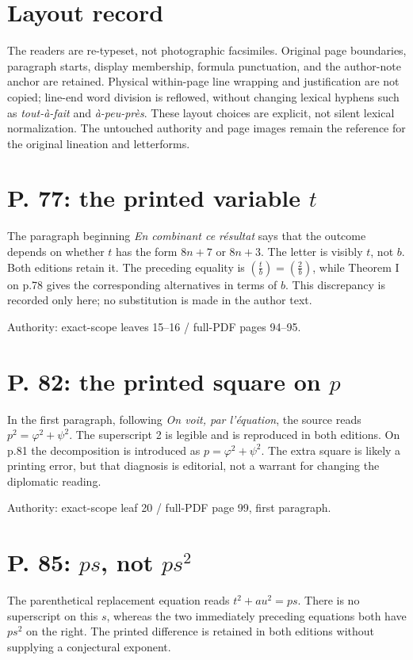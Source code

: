 \documentclass[11pt]{article}
\begin{document}
\section*{Layout record}
The readers are re-typeset, not photographic facsimiles. Original page boundaries,
paragraph starts, display membership, formula punctuation, and the author-note
anchor are retained. Physical within-page line wrapping and justification are not
copied; line-end word division is reflowed, without changing lexical hyphens such
as \emph{tout-à-fait} and \emph{à-peu-près}. These layout choices are explicit, not
silent lexical normalization. The untouched authority and page images remain the
reference for the original lineation and letterforms.

\newpage
\section*{P. 77: the printed variable $t$}
The paragraph beginning \emph{En combinant ce résultat} says that the outcome
depends on whether $t$ has the form $8n+7$ or $8n+3$. The letter is visibly $t$,
not $b$. Both editions retain it. The preceding equality is
$\left(\frac{t}{b}\right)=\left(\frac{2}{b}\right)$, while Theorem I on p.78 gives the
corresponding alternatives in terms of $b$. This discrepancy is recorded only
here; no substitution is made in the author text.

Authority: exact-scope leaves 15–16 / full-PDF pages 94–95.

\section*{P. 82: the printed square on $p$}
In the first paragraph, following \emph{On voit, par l'équation}, the source
reads $p^2=\varphi^2+\psi^2$. The superscript 2 is legible and is reproduced in
both editions. On p.81 the decomposition is introduced as $p=\varphi^2+\psi^2$.
The extra square is likely a printing error, but that diagnosis is editorial,
not a warrant for changing the diplomatic reading.

Authority: exact-scope leaf 20 / full-PDF page 99, first paragraph.

\section*{P. 85: $ps$, not $ps^2$}
The parenthetical replacement equation reads $t^2+au^2=ps$. There is no
superscript on this $s$, whereas the two immediately preceding equations
both have $ps^2$ on the right. The printed difference is retained in both
editions without supplying a conjectural exponent.
\end{document}
